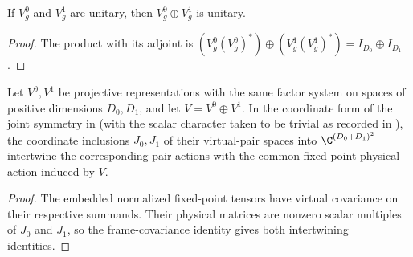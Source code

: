\begin{lemma}
    \label{thm:spt_projective_direct_sum_unitary}
    \leanok
    If $V_g^0$ and $V_g^1$ are unitary, then $V_g^0\oplus V_g^1$ is unitary.
\end{lemma}

\begin{proof}\leanok
    The product with its adjoint is
    $(V_g^0(V_g^0)^*)\oplus(V_g^1(V_g^1)^*)=I_{D_0}\oplus I_{D_1}$.
\end{proof}

\begin{lemma}
    \label{thm:spt_fixed_point_coordinate_frames}
    \leanok
    Let $V^0,V^1$ be projective representations with the same factor
    system on spaces of positive dimensions $D_0,D_1$, and let
    $V=V^0\oplus V^1$. In the coordinate form of the joint symmetry in
    \cite[Section~II.F.2]{Schuch2011Phases} (with the scalar character taken
    to be trivial as recorded in
    \cite{gap:rmp_spt_fixed_point_trivial_character}), the coordinate
    inclusions $J_0,J_1$ of their virtual-pair spaces into
    $\C^{(D_0+D_1)^2}$ intertwine the corresponding pair actions with the
    common fixed-point physical action induced by $V$.
\end{lemma}

\begin{proof}\leanok
    The embedded normalized fixed-point tensors have virtual covariance
    on their respective summands. Their physical matrices are nonzero
    scalar multiples of $J_0$ and $J_1$, so the frame-covariance identity
    gives both intertwining identities.
\end{proof}

